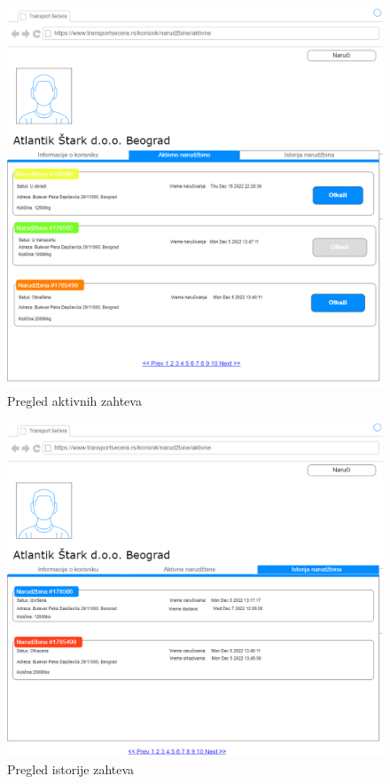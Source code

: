 \begin{figure}[H]
    \centering
    \includegraphics[scale=0.3]{Slike/KorisnickiInterfejs/Korisnik/korisnikAktivne.png}
    \caption{Pregled aktivnih zahteva}
    \label{fig:klijentAktivne}
\end{figure}
\begin{figure}[H]
    \centering
    \includegraphics[scale=0.25]{Slike/KorisnickiInterfejs/Korisnik/korisnikIstorija.png}
    \caption{Pregled istorije zahteva}
    \label{fig:klijentIstorija}
\end{figure}


